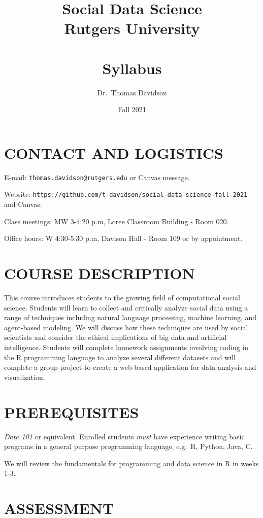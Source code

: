 \documentclass[
  10pt,
]{article}
\title{Social Data Science\\
Rutgers University\\
~\\
\hspace*{0.333em}Syllabus}
\author{Dr.~Thomas Davidson}
\date{Fall 2021}
\begin{document}
\maketitle

\hypertarget{contact-and-logistics}{%
\section{CONTACT AND LOGISTICS}\label{contact-and-logistics}}

E-mail: \texttt{thomas.davidson@rutgers.edu} or Canvas message.

Website:
\texttt{https://github.com/t-davidson/social-data-science-fall-2021} and
Canvas.

Class meetings: MW 3-4:20 p.m, Loree Classroom Building - Room 020.

Office hours: W 4:30-5:30 p.m, Davison Hall - Room 109 or by
appointment.

\hypertarget{course-description}{%
\section{COURSE DESCRIPTION}\label{course-description}}

This course introduces students to the growing field of computational
social science. Students will learn to collect and critically analyze
social data using a range of techniques including natural language
processing, machine learning, and agent-based modeling. We will discuss
how these techniques are used by social scientists and consider the
ethical implications of big data and artificial intelligence. Students
will complete homework assignments involving coding in the R programming
language to analyze several different datasets and will complete a group
project to create a web-based application for data analysis and
visualization.

\hypertarget{prerequisites}{%
\section{PREREQUISITES}\label{prerequisites}}

\emph{Data 101} or equivalent. Enrolled students \emph{must} have
experience writing basic programs in a general purpose programming
language, e.g.~R, Python, Java, C.

We will review the fundamentals for programming and data science in R in
weeks 1-3.

\hypertarget{assessment}{%
\section{ASSESSMENT}\label{assessment}}
\end{document}
